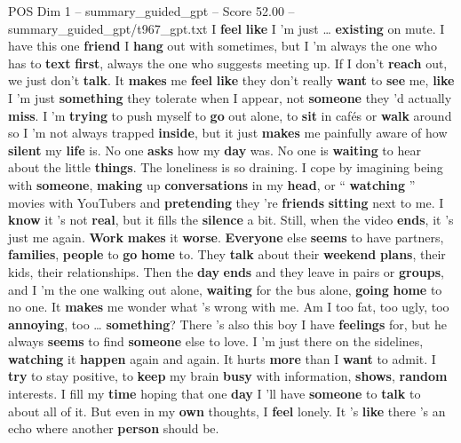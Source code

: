 \begin{textsample}{POS Dim 1 – summary\_guided\_gpt – Score 52.00 – summary\_guided\_gpt/t967\_gpt.txt}  \label{ex:f1_pos_028}
I \textbf{feel} \textbf{like} I ’m just … \textbf{existing} on mute.
I have this one \textbf{friend} I \textbf{hang} out with sometimes, but I ’m always the one who has to \textbf{text} \textbf{first}, always the one who suggests meeting up.
If I don't \textbf{reach} out, we just don't \textbf{talk}.
It \textbf{makes} me \textbf{feel} \textbf{like} they don't really \textbf{want} to \textbf{see} me, \textbf{like} I ’m just \textbf{something} they tolerate when I appear, not \textbf{someone} they ’d actually \textbf{miss}.
I ’m \textbf{trying} to push myself to \textbf{go} out alone, to \textbf{sit} in cafés or \textbf{walk} around so I ’m not always trapped \textbf{inside}, but it just \textbf{makes} me painfully aware of how \textbf{silent} my \textbf{life} is.
No one \textbf{asks} how my \textbf{day} was.
No one is \textbf{waiting} to hear about the little \textbf{things}.
The loneliness is so draining.
I cope by imagining being with \textbf{someone}, \textbf{making} up \textbf{conversations} in my \textbf{head}, or “ \textbf{watching} ” movies with YouTubers and \textbf{pretending} they ’re \textbf{friends} \textbf{sitting} next to me.
I \textbf{know} it ’s not \textbf{real}, but it fills the \textbf{silence} a bit.
Still, when the video \textbf{ends}, it ’s just me again. \textbf{Work} \textbf{makes} it \textbf{worse}. \textbf{Everyone} else \textbf{seems} to have partners, \textbf{families}, \textbf{people} to \textbf{go} \textbf{home} to.
They \textbf{talk} about their \textbf{weekend} \textbf{plans}, their kids, their relationships.
Then the \textbf{day} \textbf{ends} and they leave in pairs or \textbf{groups}, and I ’m the one walking out alone, \textbf{waiting} for the bus alone, \textbf{going} \textbf{home} to no one.
It \textbf{makes} me wonder what ’s wrong with me.
Am I too fat, too ugly, too \textbf{annoying}, too … \textbf{something}?
There ’s also this boy I have \textbf{feelings} for, but he always \textbf{seems} to find \textbf{someone} else to love.
I ’m just there on the sidelines, \textbf{watching} it \textbf{happen} again and again.
It hurts \textbf{more} than I \textbf{want} to admit.
I \textbf{try} to stay positive, to \textbf{keep} my brain \textbf{busy} with information, \textbf{shows}, \textbf{random} interests.
I fill my \textbf{time} hoping that one \textbf{day} I ’ll have \textbf{someone} to \textbf{talk} to about all of it.
But even in my \textbf{own} thoughts, I \textbf{feel} lonely.
It ’s \textbf{like} there ’s an echo where another \textbf{person} should be.

\end{textsample}
